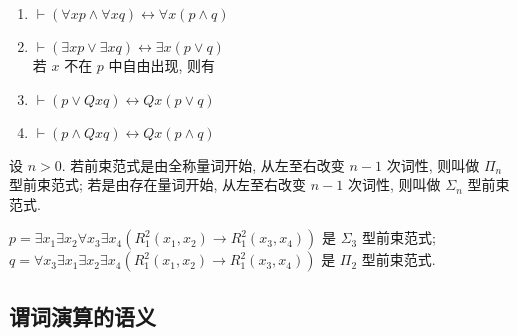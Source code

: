 \documentclass[
    color=black,
    device=normal,
    lang=cn
]{elegantnote}
\begin{document}
\begin{proposition}
    \hfill
    \begin{enumerate}[label = $\arabic*^\circ$]
        \item $\vdash (\forall x p \land \forall x q)\leftrightarrow \forall x(p\land q)$
        \item $\vdash (\exists x p \lor \exists x q)\leftrightarrow \exists x(p\lor q)$\\
              若 $x$ 不在 $p$ 中自由出现, 则有
        \item $\vdash (p\lor Qxq)\leftrightarrow Qx(p\lor q)$
        \item $\vdash (p\land Qxq)\leftrightarrow Qx(p\land q)$
    \end{enumerate}
\end{proposition}
\begin{definition}
    设 $n>0$. 若前束范式是由全称量词开始, 从左至右改变 $n-1$ 次词性, 则叫做 $\Pi_n$ 型前束范式;
    若是由存在量词开始, 从左至右改变 $n-1$ 次词性, 则叫做 $\Sigma_n$ 型前束范式.
\end{definition}
\begin{example}
    $p = \exists x_1\exists x_2\forall x_3\exists x_4 (R_1^2(x_1, x_2)\to R_1^2(x_3, x_4))$ 是 $\Sigma_3$ 型前束范式;\\
    $q = \forall x_3\exists x_1\exists x_2\exists x_4 (R_1^2(x_1, x_2)\to R_1^2(x_3, x_4))$ 是 $\Pi_2$ 型前束范式.
\end{example}

\newpage
\subsection{谓词演算的语义}
\end{document}
